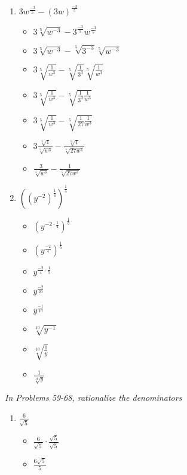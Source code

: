 \documentclass{article}
\begin{document}
\begin{onehalfspace}
\begin{enumerate}[start=53]
        \item $3w^{\frac{-3}{5}} - (3w)^{\frac{-3}{5}}$
        \begin{itemize}
            \item $3 \sqrt[5]{w^{-3}} - 3^{\frac{-3}{5}} w^{\frac{-3}{5}}$
            \item $3 \sqrt[5]{w^{-3}} - \sqrt[5]{3^{-3}} \sqrt[5]{w^{-3}}$
            \item $3 \sqrt[5]{\frac{1}{w^{3}}} - \sqrt[5]{\frac{1}{3^{3}}} \sqrt[5]{\frac{1}{w^{3}}}$
            \item $3 \sqrt[5]{\frac{1}{w^{3}}} - \sqrt[5]{\frac{1}{3^{3}}\frac{1}{w^{3}}}$
            \item $3 \sqrt[5]{\frac{1}{w^{3}}} - \sqrt[5]{\frac{1}{27}\frac{1}{w^{3}}}$
            \item $3 \frac{\sqrt[5]{1}}{\sqrt[5]{w^{3}}} - \frac{\sqrt[5]{1}}{\sqrt[5]{27w^{3}}}$
            \item $\frac{3}{\sqrt[5]{w^{3}}} - \frac{1}{\sqrt[5]{27w^{3}}}$
        \end{itemize}
        
        \item $\left( (y^{-2})^{\frac{1}{4}} \right)^{\frac{1}{5}}$
        \begin{itemize}
            \item $\left( y^{-2 \cdot \frac{1}{4}} \right)^{\frac{1}{5}}$
            \item $\left( y^{\frac{-2}{4}} \right)^{\frac{1}{5}}$
            \item $y^{\frac{-2}{4} \cdot \frac{1}{5}}$
            \item $y^{\frac{-2}{20}}$
            \item $y^{\frac{-1}{10}}$
            \item $\sqrt[10]{y^{-1}}$
            \item $\sqrt[10]{\frac{1}{y}}$
            \item $\frac{1}{\sqrt[10]{y}}$
        \end{itemize}
     \end{enumerate}

     \textit{In Problems 59-68, rationalize the denominators}
     \begin{enumerate}[start=59]
        \item $\frac{6}{\sqrt{5}}$
        \begin{itemize}
            \item $\frac{6}{\sqrt{5}} \cdot \frac{\sqrt{5}}{\sqrt{5}}$
            \item $\frac{6\sqrt{5}}{5}$
        \end{itemize}


\end{enumerate}
\end{onehalfspace}
\end{document}
